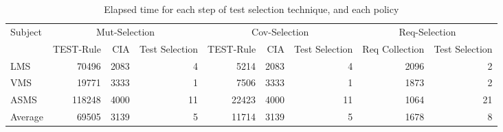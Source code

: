 \begin{table}[htbp]
  \centering
  \caption{Elapsed time for each step of test selection technique, and each policy}
  	\vspace{-8pt}   
    \begin{tabular}{|l|r|r|r||r|r|r||r|r|}

			\hline
       \multirow{2}{*}{Subject}   & \multicolumn{3}{|c||}{Mut-Selection} & \multicolumn{3}{|c||}{Cov-Selection} & \multicolumn{2}{|c|}{Req-Selection} \\\cline{2-9}

          & TEST-Rule & CIA & Test Selection & TEST-Rule & CIA& Test Selection & Req Collection & Test Selection \\\hline\hline

		LMS   & 70496 & 2083  & 4     & 5214  & 2083  & 4     & 2096  & 2 \\\hline
    VMS   & 19771 & 3333  & 1     & 7506  & 3333  & 1     & 1873  & 2 \\\hline
    ASMS  & 118248 & 4000  & 11    & 22423 & 4000  & 11    & 1064  & 21 \\\hline\hline
    Average & 69505 & 3139  & 5     & 11714 & 3139  & 5     & 1678  & 8 \\\hline

    
    \end{tabular}%
  \label{tab:performance-results}%
\end{table}%

